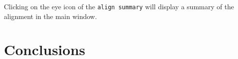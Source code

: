 \documentclass[a4paper,10pt]{article}
\begin{document}
Clicking on the eye icon of the \texttt{\footnotesize{align summary}} will display a summary of the alignment in the main window.\vspace{1em}\\
\setlength\fboxsep{0pt}\vspace{1em}

\section{Conclusions}
\end{document}
